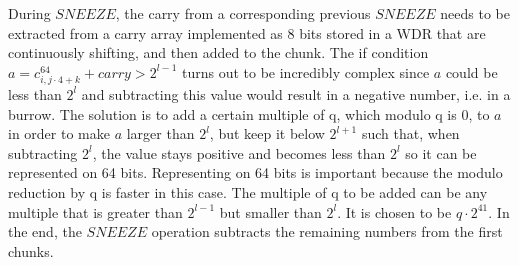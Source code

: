 During $SNEEZE$, the carry from a corresponding previous $SNEEZE$ needs to be extracted from a carry array implemented as 8 bits stored in a WDR that are continuously shifting, and then added to the chunk. The if condition $a = c^{64}_{i, j \cdot 4 + k} + carry > 2^{l-1}$ turns out to be incredibly complex since $a$ could be less than $2^l$ and subtracting this value would result in a negative number, i.e. in a burrow. The solution is to add a certain multiple of q, which modulo q is 0, to $a$ in order to make $a$ larger than $2^l$, but keep it below $2^{l+1}$ such that, when subtracting $2^l$, the value stays positive and becomes less than $2^l$ so it can be represented on 64 bits. Representing on 64 bits is important because the modulo reduction by q is faster in this case. The multiple of q to be added can be any multiple that is greater than $2^{l-1}$ but smaller than $2^l$. It is chosen to be $q \cdot 2^{41}$. In the end, the $SNEEZE$ operation subtracts the remaining numbers from the first chunks.


